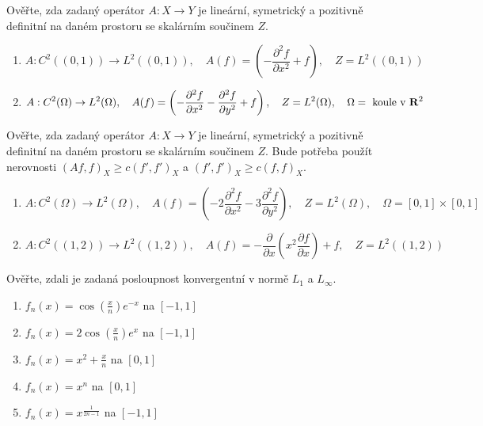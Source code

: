 \documentclass[a4paper,10pt]{book}
\def\to{\rightarrow}
\def\Real{{\rm\bf R}}
\def\prtl{\partial}                                        %
\begin{document}
\exercise \label{ex:op2} Ověřte, zda zadaný operátor $A: X \to Y$ je lineární, symetrický a pozitivně definitní
na daném prostoru se skalárním součinem $Z$. \\
\begin{enumerate}[label={\alph*)},itemsep=-2pt, topsep=-7pt]
  \item \begin{equation}
          A:C^2((0,1))\to L^2((0,1)),\quad A(f)=\left(-\frac{\prtl^2 f}{\prtl x^2} +f \right),
          \quad Z=L^2((0,1)) \nonumber
        \end{equation}
  \item \begin{equation}
          A:C^2(\Omega)\to L^2(\Omega),\quad A(f)=\left(-\frac{\prtl^2 f}{\prtl x^2} -\frac{\prtl^2 f}{\prtl y^2} + f \right),
          \quad Z=L^2(\Omega),\quad \Omega= \text{  koule v }\Real^2 \nonumber
        \end{equation}
\end{enumerate} 
  
\exercise \label{ex:op3} Ověřte, zda zadaný operátor $A: X \to Y$ je lineární, symetrický a pozitivně definitní
na daném prostoru se skalárním součinem $Z$. Bude potřeba použít nerovnosti $(Af,f)_X \ge c(f',f')_X$ a $(f',f')_X \ge c(f,f)_X$.
\begin{enumerate}[label={\alph*)},itemsep=-2pt, topsep=-7pt]
  \item \begin{equation}
            A:C^2(\Omega)\to L^2(\Omega),\quad A(f)=\left(-2\frac{\prtl^2 f}{\prtl x^2} -3 \frac{\prtl^2 f}{\prtl y^2} \right)
            , \quad Z=L^2(\Omega),\quad \Omega=[0,1]\times[0,1] \nonumber
        \end{equation}
  \item \begin{equation}
            A:C^2((1,2))\to L^2((1,2)),\quad A(f)=-\frac{\prtl }{\prtl x}\left( x^2 \frac{\prtl f}{\prtl x} \right)+ f,
            \quad Z=L^2((1,2)) \nonumber
         \end{equation}
\end{enumerate} 

\exercise \label{ex:con1} Ověřte, zdali je zadaná posloupnost konvergentní v normě $L_1$ a $L_\infty$.
\begin{enumerate}[label=\alph*), itemsep=-3pt, topsep=-7pt]
  \item $f_n(x)=\cos\left(\frac{x}{n}\right)e^{-x}$ na $[-1,1]$
  \item $f_n(x)=2\cos\left(\frac{x}{n}\right)e^x$ na $[-1,1]$
  \item $f_n(x)=x^2+\frac{x}{n}$ na $[0,1]$
  \item $f_n(x)=x^n$ na $[0,1]$
  \item $f_n(x)=x^\frac{1}{2n-1}$ na $[-1,1]$
\end{enumerate}
\end{document}
